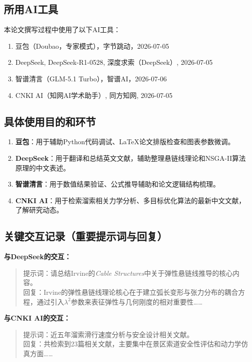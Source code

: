 \documentclass[12pt,a4paper]{ctexart}
\begin{document}
\subsection*{所用AI工具}

本论文撰写过程中使用了以下AI工具：

\begin{enumerate}[label=\arabic*.]
  \item 豆包（Doubao，专家模式），字节跳动，2026-07-05
  \item DeepSeek, DeepSeek-R1-0528, 深度求索（DeepSeek）, 2026-07-05
  \item 智谱清言（GLM-5.1 Turbo），智谱AI，2026-07-06
  \item CNKI AI（知网AI学术助手）, 同方知网, 2026-07-05
\end{enumerate}

\subsection*{具体使用目的和环节}

\begin{enumerate}[label=\arabic*.]
  \item \textbf{豆包}：用于辅助Python代码调试、LaTeX论文排版检查和图表参数微调。
  \item \textbf{DeepSeek}：用于翻译和总结英文文献，辅助整理悬链线理论和NSGA-II算法原理的中文表述。
  \item \textbf{智谱清言}：用于数值结果验证、公式推导辅助和论文逻辑结构梳理。
  \item \textbf{CNKI AI}：用于检索溜索相关力学分析、多目标优化算法的最新中文文献，了解研究动态。
\end{enumerate}

\subsection*{关键交互记录（重要提示词与回复）}

\noindent \textbf{与DeepSeek的交互：}
\begin{quote}
  提示词：请总结Irvine的\textit{Cable Structures}中关于弹性悬链线推导的核心内容。\\
  回复：Irvine的弹性悬链线理论核心在于建立弧长变形与张力分布的耦合方程，通过引入$\lambda^2$参数来表征弹性与几何刚度的相对重要性……
\end{quote}

\noindent \textbf{与CNKI AI的交互：}
\begin{quote}
  提示词：近五年溜索滑行速度分析与安全设计相关文献。\\
  回复：共检索到23篇相关文献，主要集中在景区索道安全性评估和动力学仿真方面……
\end{quote}
\end{document}
